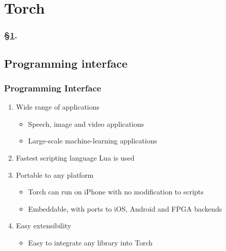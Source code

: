 
\section{Torch}\label{sec:Torch}


\frameinlbffalse

{

\begin{frame}[plain]
\frametitle{\S\ref{sec:Torch}. \insertsection}
\listofframes
\end{frame}
\addtocounter{framenumber}{-1} %

}

\frameinlbftrue

\subsection{Programming interface}

\begin{frame}
  \MyLogo
  \frametitle{Programming Interface}  
\begin{enumerate}
\item Wide range of applications
\begin{itemize}
\item Speech, image and video applications
\item  Large-scale machine-learning applications
\end{itemize}
\item Fastest scripting language Lua is used
\item Portable to any platform
\begin{itemize}
\item Torch can run on iPhone with no modification to scripts
\item Embeddable, with ports to iOS, Android and FPGA backends
\end{itemize}
\item Easy extensibility
\begin{itemize}
\item Easy to integrate any library into Torch
\end{itemize}
\end{enumerate}
\end{frame}

